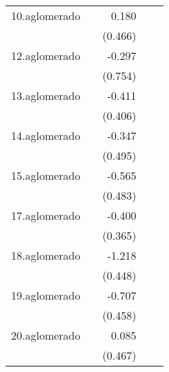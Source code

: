 {\begin{longtable}{l*{4}{D{.}{.}{-1}}}
\addlinespace
10.aglomerado&                     &       0.180         &                     &                     \\
            &                     &     (0.466)         &                     &                     \\
\addlinespace
12.aglomerado&                     &      -0.297         &                     &                     \\
            &                     &     (0.754)         &                     &                     \\
\addlinespace
13.aglomerado&                     &      -0.411         &                     &                     \\
            &                     &     (0.406)         &                     &                     \\
\addlinespace
14.aglomerado&                     &      -0.347         &                     &                     \\
            &                     &     (0.495)         &                     &                     \\
\addlinespace
15.aglomerado&                     &      -0.565         &                     &                     \\
            &                     &     (0.483)         &                     &                     \\
\addlinespace
17.aglomerado&                     &      -0.400         &                     &                     \\
            &                     &     (0.365)         &                     &                     \\
\addlinespace
18.aglomerado&                     &      -1.218\sym{**} &                     &                     \\
            &                     &     (0.448)         &                     &                     \\
\addlinespace
19.aglomerado&                     &      -0.707         &                     &                     \\
            &                     &     (0.458)         &                     &                     \\
\addlinespace
20.aglomerado&                     &       0.085         &                     &                     \\
            &                     &     (0.467)         &                     &                     \\

\end{longtable}}
